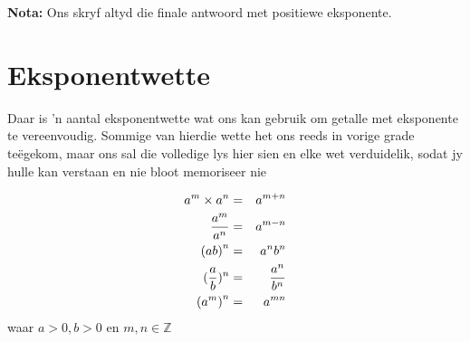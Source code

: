 % 
% 
% 
% 
% 
% 
% 
      
\textbf{Nota:} Ons skryf altyd die finale antwoord met positiewe eksponente.


% 
% 
% 
% 

   
    


\section {Eksponentwette}
\nopagebreak

\label{m38359*id63061}Daar is 'n aantal eksponentwette wat ons kan gebruik om getalle met eksponente te vereenvoudig. Sommige
van hierdie wette het ons reeds in vorige grade teëgekom, maar ons sal die volledige lys hier sien en elke wet
verduidelik, sodat jy hulle kan verstaan en nie bloot memoriseer nie


\begin{eqnarray*}
{a}^{m}\ensuremath{\times}{a}^{n}& =& {a}^{m+n}\hfill \\ 
\frac{{a}^{m}}{{a}^{n}}& =& {a}^{m-n}\hfill \\ 
{\left(ab\right)}^{n}& =& {a}^{n}{b}^{n}\hfill \\ 
        (\frac{a}{b})^n & = & \frac{a^n}{b^n} \\
{\left({a}^{m}\right)}^{n}& =& {a}^{mn}\hfill 
\end{eqnarray*}
waar $a > 0, b > 0$ en $m,n \in \mathbb{Z}$

